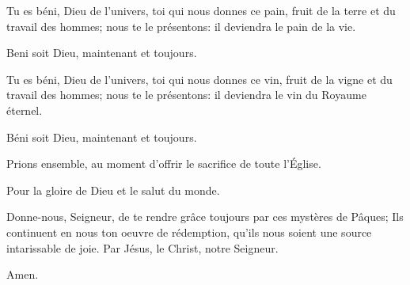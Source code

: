 \pr Tu es béni, Dieu de l'univers, toi qui nous donnes ce pain, fruit de la terre et du travail des hommes; nous te le présentons: il deviendra le pain de la vie.

\be Beni soit Dieu, maintenant et toujours.

\pr Tu es béni, Dieu de l’univers, toi qui nous donnes ce vin, fruit de la vigne et du travail des hommes; nous te le présentons: il deviendra le vin du Royaume éternel.

\be Béni soit Dieu, maintenant et toujours.

\pr Prions ensemble, au moment d'offrir le sacrifice de toute l'Église.

\be Pour la gloire de Dieu et le salut du monde.

\pr Donne-nous, Seigneur, de te rendre grâce toujours par ces mystères de Pâques; Ils continuent en nous ton oeuvre de rédemption, qu’ils nous soient une source intarissable de joie. Par Jésus, le Christ, notre Seigneur.

\be Amen.